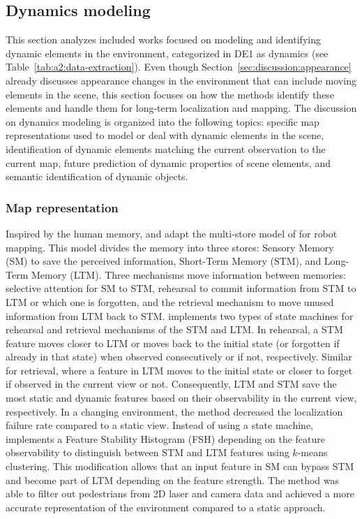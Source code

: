 \subsection{Dynamics modeling}
\label{sec:discussion:dynamics}

This section analyzes included works focused on modeling and identifying dynamic elements in the environment, categorized in DE1 as dynamics (see Table~\ref{tab:a2:data-extraction}).
Even though Section~\ref{sec:discussion:appearance} already discusses appearance changes in the environment that can include moving elements in the scene, this section focuses on how the methods identify these elements and handle them for long-term localization and mapping.
The discussion on dynamics modeling is organized into the following topics: specific map representations used to model or deal with dynamic elements in the scene, identification of dynamic elements matching the current observation to the current map, future prediction of dynamic properties of scene elements, and semantic identification of dynamic objects.



\subsubsection{Map representation}
\label{sec:discussion:dynamics:map}

Inspired by the human memory, \cite{dayoub-et-al:2011:013} and \cite{bacca-et-al:2013:003} adapt the multi-store model of \cite{discussion:atkinson:stm+ltm} for robot mapping. This model divides the memory into three stores: Sensory Memory (SM) to save the perceived information, Short-Term Memory (STM), and Long-Term Memory (LTM).
Three mechanisms move information between memories: selective attention for SM to STM, rehearsal to commit information from STM to LTM or which one is forgotten, and the retrieval mechanism to move unused information from LTM back to STM.
\cite{dayoub-et-al:2011:013} implements two types of state machines for rehearsal and retrieval mechanisms of the STM and LTM. In rehearsal, a STM feature moves closer to LTM or moves back to the initial state (or forgotten if already in that state) when observed consecutively or if not, respectively. Similar for retrieval, where a feature in LTM moves to the initial state or closer to forget if observed in the current view or not.
Consequently, LTM and STM save the most static and dynamic features based on their observability in the current view, respectively.
In a changing environment, the method decreased the localization failure rate compared to a static view.
Instead of using a state machine, \cite{bacca-et-al:2013:003} implements a Feature Stability Histogram (FSH) depending on the feature observability to distinguish between STM and LTM features using $k$-means clustering. This modification allows that an input feature in SM can bypass STM and become part of LTM depending on the feature strength.
The method was able to filter out pedestrians from 2D laser and camera data and achieved a more accurate representation of the environment compared to a static approach.

